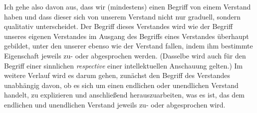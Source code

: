 Ich gehe also davon aus, dass wir (mindestens) einen Begriff von einem
 Verstand haben und dass dieser sich von unserem Verstand
nicht nur graduell, sondern qualitativ unterscheidet. Der Begriff dieses
Verstandes wird wie der Begriff unseres eigenen Verstandes im Ausgang des
Begriffs eines Verstandes überhaupt gebildet, unter den unserer ebenso
wie der  Verstand fallen, indem ihm bestimmte
Eigenschaft jeweils zu- oder abgesprochen werden. (Dasselbe wird auch
für den Begriff einer
sinnlichen \emph{respective} einer intellektuellen Anschauung gelten.) Im
weitere Verlauf wird es darum gehen, zunächst den Begriff des Verstandes unabhängig
davon, ob es sich um einen endlichen oder unendlichen Verstand handelt, zu
explizieren und anschließend herauszuarbeiten, was es ist, das dem
endlichen und unendlichen Verstand jeweils zu- oder abgesprochen wird.


